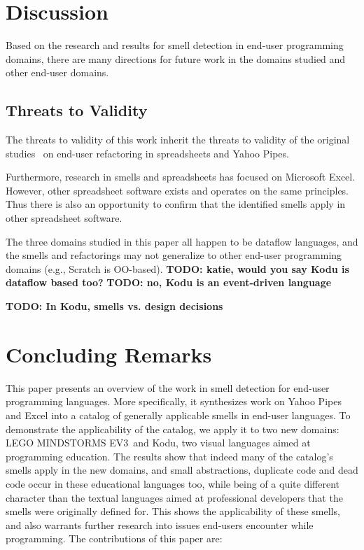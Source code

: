 \documentclass{sig-alternate}
\newcommand{\todo}[1]{\textbf{TODO: #1}}
\newcommand{\ms}{LEGO MINDSTORMS EV3}
\begin{document}
\section{Discussion}
\label{sec:discussion}

Based on the research and results for smell detection in end-user programming domains, there are many directions for future work in the domains studied and other end-user domains.





\subsection{Threats to Validity}
The threats to validity of this work inherit the threats to validity of the original studies~\cite{Stolee2015, Stolee2011, StoleeTSE2013, Hermans2011, Hermans2012intra, Hermans2012inter, hermans2014bumblebee, badame2012refactoring} on end-user refactoring in spreadsheets and Yahoo Pipes.

Furthermore, research in smells and spreadsheets has focused on Microsoft Excel. However, other spreadsheet software exists and operates on the same principles. Thus there is also an opportunity to confirm that the identified smells apply in other spreadsheet software.


The three domains studied in this paper all happen to be dataflow languages, and the smells and refactorings may not generalize to other end-user programming domains (e.g., Scratch is OO-based). \todo{katie, would you say Kodu is dataflow based too?} \todo{no, Kodu is an event-driven language}


\todo{In Kodu, smells vs. design decisions}

\section{Concluding Remarks}
\label{sec:conclusions}
This paper presents an overview of the work in smell detection for end-user programming languages. More specifically, it synthesizes work on Yahoo Pipes and Excel into a catalog of generally applicable smells in end-user languages. To demonstrate the applicability of the catalog, we apply it to two new domains: \ms~and Kodu, two visual languages aimed at programming education. The results show that indeed many of the catalog's smells apply in the new domains, and small abstractions, duplicate code and dead code occur in these educational languages too, while being of a quite different character than the textual languages aimed at professional developers that the smells were originally defined for. This shows the applicability of these smells, and also warrants further research into issues end-users encounter while programming. The contributions of this paper are:
\end{document}
